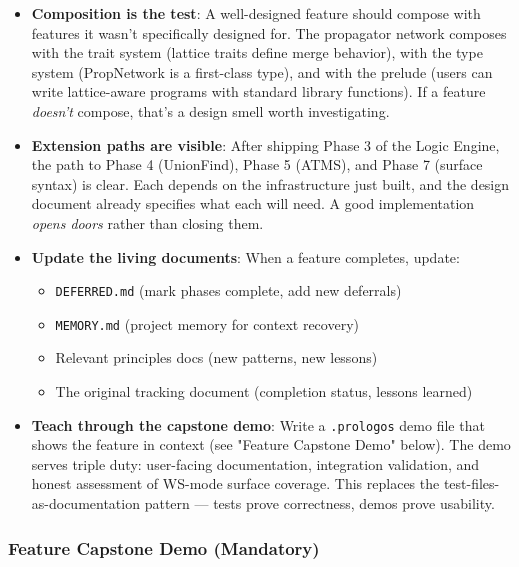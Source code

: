 \documentclass[11pt]{article}
\begin{document}
\begin{itemize}
\item \textbf{Composition is the test}: A well-designed feature should compose
with features it wasn't specifically designed for. The propagator
network composes with the trait system (lattice traits define merge
behavior), with the type system (PropNetwork is a first-class type),
and with the prelude (users can write lattice-aware programs with
standard library functions). If a feature \emph{doesn't} compose, that's
a design smell worth investigating.

\item \textbf{Extension paths are visible}: After shipping Phase 3 of the Logic
Engine, the path to Phase 4 (UnionFind), Phase 5 (ATMS), and
Phase 7 (surface syntax) is clear. Each depends on the infrastructure
just built, and the design document already specifies what each will
need. A good implementation \emph{opens doors} rather than closing them.

\item \textbf{Update the living documents}: When a feature completes, update:
\begin{itemize}
\item \texttt{DEFERRED.md} (mark phases complete, add new deferrals)
\item \texttt{MEMORY.md} (project memory for context recovery)
\item Relevant principles docs (new patterns, new lessons)
\item The original tracking document (completion status, lessons learned)
\end{itemize}

\item \textbf{Teach through the capstone demo}: Write a \texttt{.prologos} demo file that
shows the feature in context (see "Feature Capstone Demo" below). The
demo serves triple duty: user-facing documentation, integration
validation, and honest assessment of WS-mode surface coverage. This
replaces the test-files-as-documentation pattern — tests prove
correctness, demos prove usability.
\end{itemize}
\subsubsection{Feature Capstone Demo (Mandatory)}
\label{sec:orgb267be6}
\end{document}
